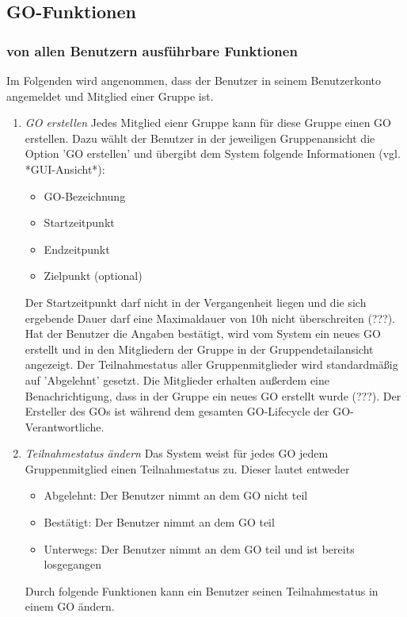 \documentclass[parskip=full]{scrartcl}
\def\threedigits#1{%
  \ifnum#1<100 0\fi
  \ifnum#1<10 0\fi
  \number#1}
\begin{document}
\subsection{GO-Funktionen}

\subsubsection{von allen Benutzern ausführbare Funktionen}
Im Folgenden wird angenommen, dass der Benutzer in seinem Benutzerkonto angemeldet und Mitglied einer Gruppe ist.

\begin{enumerate}[label={\textbf{/F\protect\threedigits{\theenumi}0/}}, leftmargin=*, resume]	
	\item \textit{GO erstellen} Jedes Mitglied eienr Gruppe kann für diese Gruppe einen GO erstellen. Dazu wählt der Benutzer in der jeweiligen Gruppenansicht die Option 'GO erstellen' und übergibt dem System folgende Informationen (vgl. *GUI-Ansicht*):
	\begin{itemize}
		\item GO-Bezeichnung
		\item Startzeitpunkt
		\item Endzeitpunkt
		\item Zielpunkt (optional)
	\end{itemize}
Der Startzeitpunkt darf nicht in der Vergangenheit liegen und die sich ergebende Dauer darf eine Maximaldauer von 10h nicht überschreiten (???).\\
Hat der Benutzer die Angaben bestätigt, wird vom System ein neues GO erstellt und in den Mitgliedern der Gruppe in der Gruppendetailansicht angezeigt. Der Teilnahmestatus aller Gruppenmitglieder wird standardmäßig auf 'Abgelehnt' gesetzt. Die Mitglieder erhalten außerdem eine Benachrichtigung, dass in der Gruppe ein neues GO erstellt wurde (???). Der Ersteller des GOs ist während dem gesamten GO-Lifecycle der GO-Verantwortliche.
	
	\item \textit{Teilnahmestatus ändern} Das System weist für jedes GO jedem Gruppenmitglied einen Teilnahmestatus zu. Dieser lautet entweder
	\begin{itemize}
		\item Abgelehnt: Der Benutzer nimmt an dem GO nicht teil
		\item Bestätigt: Der Benutzer nimmt an dem GO teil
		\item Unterwegs: Der Benutzer nimmt an dem GO teil und ist bereits losgegangen
	\end{itemize}
Durch folgende Funktionen kann ein Benutzer seinen Teilnahmestatus in einem GO ändern.


\end{enumerate}
\end{document}
